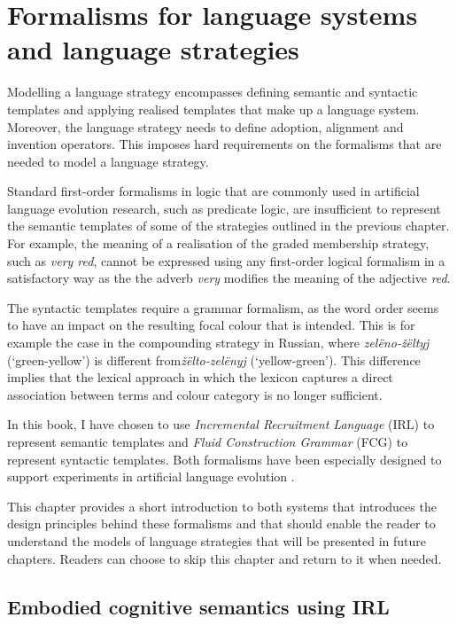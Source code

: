 \chapter{Formalisms for language systems and language strategies}
\label{s:formalisms}

Modelling a language strategy encompasses defining semantic and
syntactic templates and applying realised templates that make up a
language system. Moreover, the language strategy needs to define
adoption, alignment and invention operators. This imposes hard
requirements on the formalisms that are needed to model a language
strategy.

Standard first-order formalisms in logic that are commonly used in
artificial language evolution research, such as predicate logic, are
insufficient to represent the semantic templates of some of the
strategies outlined in the previous chapter. For example, the meaning
of a realisation of the graded membership strategy, such as \textit{very
red}, cannot be expressed using any first-order logical formalism in
a satisfactory way as the the adverb \textit{very} modifies the meaning of
the adjective \textit{red}.

The syntactic templates require a grammar formalism, as the word order
seems to have an impact on the resulting focal colour that is
intended.  This is for example the case in the compounding strategy in
Russian, where \textit{zel\"eno-\v z\"eltyj} (`green-yellow') is different
from\textit{\v z\"elto-zel\"enyj} (`yellow-green'). This difference implies
that the lexical approach in which the lexicon captures a direct
association between terms and colour category is no longer sufficient.

In this book, I have chosen to use \emph{Incremental Recruitment
  Language} (IRL) to represent semantic templates and \emph{Fluid
  Construction Grammar} (FCG) to represent syntactic templates. Both
formalisms have been especially designed to support experiments in
artificial language evolution \citep{loetzsch09understanding}.

This chapter provides a short introduction to both systems that
introduces the design principles behind these formalisms and that
should enable the reader to understand the models of language
strategies that will be presented in future chapters. Readers can
choose to skip this chapter and return to it when needed.

\section{Embodied cognitive semantics using IRL}
\label{s:irl}

